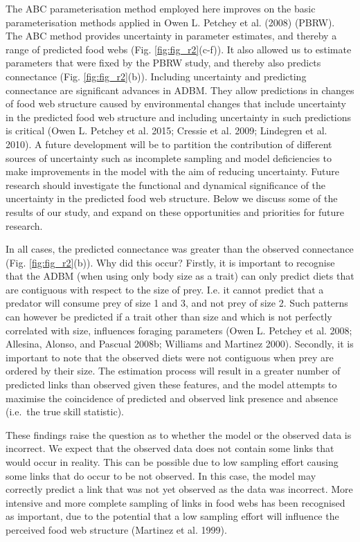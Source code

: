 \documentclass{article}
\begin{document}
The ABC parameterisation method employed here improves on the basic
parameterisation methods applied in Owen L. Petchey et al. (2008)
(PBRW). The ABC method provides uncertainty in parameter estimates, and
thereby a range of predicted food webs (Fig. \ref{fig:fig_r2}(c-f)). It
also allowed us to estimate parameters that were fixed by the PBRW
study, and thereby also predicts connectance (Fig. \ref{fig:fig_r2}(b)).
Including uncertainty and predicting connectance are significant
advances in ADBM. They allow predictions in changes of food web
structure caused by environmental changes that include uncertainty in
the predicted food web structure and including uncertainty in such
predictions is critical (Owen L. Petchey et al. 2015; Cressie et al.
2009; Lindegren et al. 2010). A future development will be to partition
the contribution of different sources of uncertainty such as incomplete
sampling and model deficiencies to make improvements in the model with
the aim of reducing uncertainty. Future research should investigate the
functional and dynamical significance of the uncertainty in the
predicted food web structure. Below we discuss some of the results of
our study, and expand on these opportunities and priorities for future
research.

In all cases, the predicted connectance was greater than the observed
connectance (Fig. \ref{fig:fig_r2}(b)). Why did this occur? Firstly, it
is important to recognise that the ADBM (when using only body size as a
trait) can only predict diets that are contiguous with respect to the
size of prey. I.e. it cannot predict that a predator will consume prey
of size 1 and 3, and not prey of size 2. Such patterns can however be
predicted if a trait other than size and which is not perfectly
correlated with size, influences foraging parameters (Owen L. Petchey et
al. 2008; Allesina, Alonso, and Pascual 2008b; Williams and Martinez
2000). Secondly, it is important to note that the observed diets were
not contiguous when prey are ordered by their size. The estimation
process will result in a greater number of predicted links than observed
given these features, and the model attempts to maximise the coincidence
of predicted and observed link presence and absence (i.e.~the true skill
statistic).

These findings raise the question as to whether the model or the
observed data is incorrect. We expect that the observed data does not
contain some links that would occur in reality. This can be possible due
to low sampling effort causing some links that do occur to be not
observed. In this case, the model may correctly predict a link that was
not yet observed as the data was incorrect. More intensive and more
complete sampling of links in food webs has been recognised as
important, due to the potential that a low sampling effort will
influence the perceived food web structure (Martinez et al. 1999).
\end{document}
